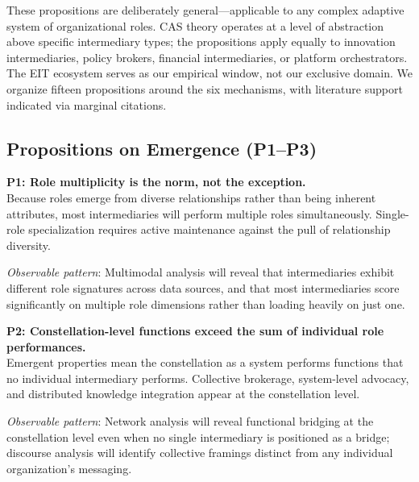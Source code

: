 \documentclass[../main.tex]{subfiles}
\begin{document}
These propositions are deliberately general---applicable to any complex adaptive system of organizational roles. CAS theory operates at a level of abstraction above specific intermediary types; the propositions apply equally to innovation intermediaries, policy brokers, financial intermediaries, or platform orchestrators. The EIT ecosystem serves as our empirical window, not our exclusive domain. We organize fifteen propositions around the six mechanisms, with literature support indicated via marginal citations.

\subsection{Propositions on Emergence (P1--P3)}

\begin{propositionbox}
\textbf{P1: Role multiplicity is the norm, not the exception.}\\[3pt]
Because roles emerge from diverse relationships rather than being inherent attributes, most intermediaries will perform multiple roles simultaneously. Single-role specialization requires active maintenance against the pull of relationship diversity.

\vspace{4pt}
\textit{Observable pattern}: Multimodal analysis will reveal that intermediaries exhibit different role signatures across data sources, and that most intermediaries score significantly on multiple role dimensions rather than loading heavily on just one.
\end{propositionbox}

\begin{propositionbox}
\textbf{P2: Constellation-level functions exceed the sum of individual role performances.}\\[3pt]
Emergent properties mean the constellation as a system performs functions that no individual intermediary performs. Collective brokerage, system-level advocacy, and distributed knowledge integration appear at the constellation level.

\vspace{4pt}
\textit{Observable pattern}: Network analysis will reveal functional bridging at the constellation level even when no single intermediary is positioned as a bridge; discourse analysis will identify collective framings distinct from any individual organization's messaging.
\end{propositionbox}
\end{document}

